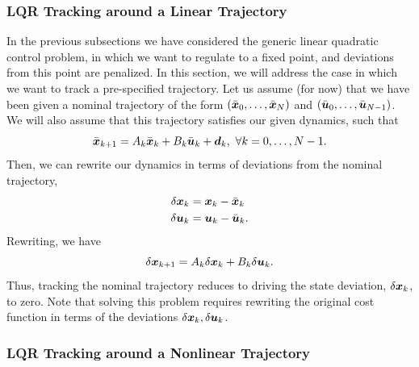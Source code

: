 \subsubsection{LQR Tracking around a Linear Trajectory}

In the previous subsections we have considered the generic linear quadratic control problem, in which we want to regulate to a fixed point, and deviations from this point are penalized. In this section, we will address the case in which we want to track a pre-specified trajectory. Let us assume (for now) that we have been given a nominal trajectory of the form $(\bar{\bm{x}}_0, \ldots, \bar{\bm{x}}_{N})$ and $(\bar{\bm{u}}_0, \ldots, \bar{\bm{u}}_{N-1})$. We will also assume that this trajectory satisfies our given dynamics, such that 
\begin{equation}
\bar{\bm{x}}_{k+1} = A_k \bar{\bm{x}}_k + B_k \bar{\bm{u}}_k + \bm{d}_k,\,\, \forall k = 0, \ldots, N-1.    
\end{equation}
Then, we can rewrite our dynamics in terms of deviations from the nominal trajectory, 
\begin{align}
    \delta \bm{x}_k &= \bm{x}_k - \bar{\bm{x}}_k\\
    \delta \bm{u}_k &= \bm{u}_k - \bar{\bm{u}}_k.
\end{align}
Rewriting, we have 
\begin{equation}
    \delta \bm{x}_{k+1} = A_k \delta \bm{x}_k + B_k \delta \bm{u}_k.
\end{equation}
Thus, tracking the nominal trajectory reduces to driving the state deviation, $\delta \bm{x}_k$, to zero. Note that solving this problem requires rewriting the original cost function in terms of the deviations $\delta \bm{x}_k, \delta \bm{u}_k$. 


\subsubsection{LQR Tracking around a Nonlinear Trajectory}

